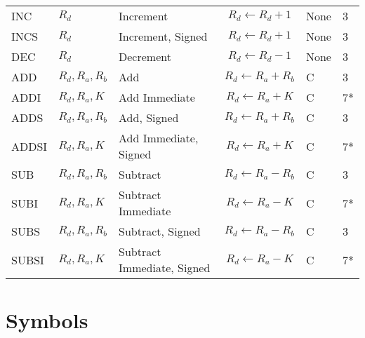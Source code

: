 \documentclass[12pt,twoside]{report}
\begin{document}
{\begin{longtable}{ | l | l | l | c | l | l | }
INC & $R_d$ & Increment & $R_d \leftarrow R_d + 1$ & None & 3 \\
INCS & $R_d$ & Increment, Signed & $R_d \leftarrow R_d + 1$ & None & 3 \\
DEC & $R_d$ & Decrement & $R_d \leftarrow R_d - 1$ & None & 3 \\
ADD & $R_d, R_a, R_b$ & Add & $R_d \leftarrow R_a + R_b$ & C & 3 \\
ADDI & $R_d, R_a, K$ & Add Immediate & $R_d \leftarrow R_a + K$ & C & 7* \\
ADDS & $R_d, R_a, R_b$ & Add, Signed & $R_d \leftarrow R_a + R_b$ & C & 3 \\
ADDSI & $R_d, R_a, K$ & Add Immediate, Signed & $R_d \leftarrow R_a + K$ & C & 7* \\
SUB & $R_d, R_a, R_b$ & Subtract & $R_d \leftarrow R_a - R_b$ & C & 3 \\
SUBI & $R_d, R_a, K$ & Subtract Immediate & $R_d \leftarrow R_a - K$ & C & 7* \\
SUBS & $R_d, R_a, R_b$ & Subtract, Signed & $R_d \leftarrow R_a - R_b$ & C & 3 \\
SUBSI & $R_d, R_a, K$ & Subtract Immediate, Signed & $R_d \leftarrow R_a - K$ & C & 7* \\
 \hline
\end{longtable}}

\section{Symbols}
\end{document}
